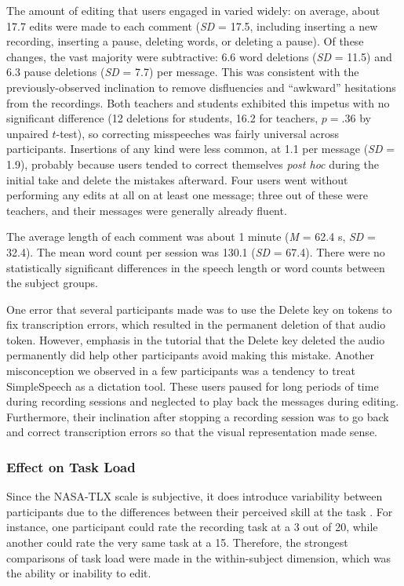 The amount of editing that users engaged in varied widely: on average, about 17.7 edits were made to each comment (\textit{SD} = 17.5, including inserting a new recording, inserting a pause, deleting words, or deleting a pause). 
Of these changes, the vast majority were subtractive: 6.6 word deletions (\textit{SD} = 11.5) and 6.3 pause deletions (\textit{SD} = 7.7) per message.
This was consistent with the previously-observed inclination to remove disfluencies and ``awkward'' hesitations from the recordings.
Both teachers and students exhibited this impetus with no significant difference (12 deletions for students, 16.2 for teachers, $p=.36$ by unpaired $t$-test), so correcting misspeeches was fairly universal across participants.
Insertions of any kind were less common, at 1.1 per message (\textit{SD} = 1.9), probably because users tended to correct themselves \emph{post hoc} during the initial take and delete the mistakes afterward.
Four users went without performing any edits at all on at least one message; three out of these were teachers, and their messages were generally already fluent.

The average length of each comment was about 1 minute (\textit{M} = 62.4 s, \textit{SD} = 32.4). The mean word count per session was 130.1 (\textit{SD} = 67.4). There were no statistically significant differences in the speech length or word counts between the subject groups.

One error that several participants made was to use the Delete key on tokens to fix transcription errors, which resulted in the permanent deletion of that audio token. 
However, emphasis in the tutorial that the Delete key deleted the audio permanently did help other participants avoid making this mistake.
Another misconception we observed in a few participants was a tendency to treat SimpleSpeech as a dictation tool. 
These users paused for long periods of time during recording sessions and neglected to play back the messages during editing. 
Furthermore, their inclination after stopping a recording session was to go back and correct transcription errors so that the visual representation made sense.

\subsubsection{Effect on Task Load}
Since the NASA-TLX scale is subjective, it does introduce variability between participants due to the differences between their perceived skill at the task \cite{nasatlx}. 
For instance, one participant could rate the recording task at a 3 out of 20, while another could rate the very same task at a 15.
Therefore, the strongest comparisons of task load were made in the within-subject dimension, which was the ability or inability to edit.

